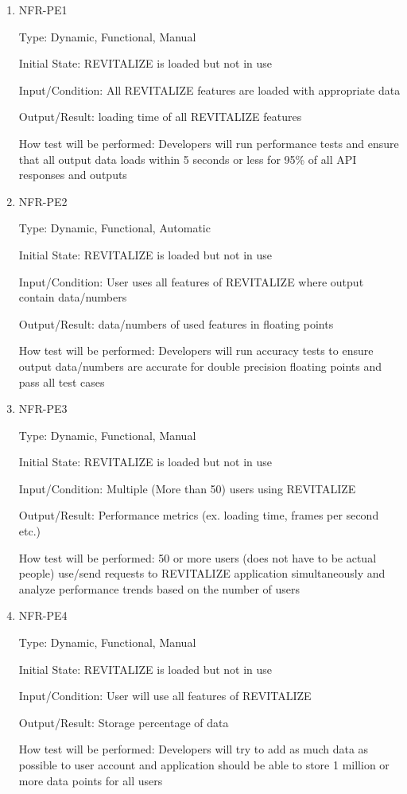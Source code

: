 \documentclass[12pt, titlepage]{article}
\begin{document}
\begin{enumerate}
	
	\item{NFR-PE1\\}
	
	Type: Dynamic, Functional, Manual
	
	Initial State: REVITALIZE is loaded but not in use
	
	Input/Condition: All REVITALIZE features are loaded with appropriate data
	
	Output/Result: loading time of all REVITALIZE features
	
	How test will be performed: Developers will run performance tests and ensure that all output data loads within 5 seconds or less for 95\% of all API responses and outputs
	
	\item{NFR-PE2\\}
	
	Type: Dynamic, Functional, Automatic
	
	Initial State: REVITALIZE is loaded but not in use
	
	Input/Condition: User uses all features of REVITALIZE where output contain data/numbers
	
	Output/Result: data/numbers of used features in floating points
	
	How test will be performed: Developers will run accuracy tests to ensure output data/numbers are accurate for double precision floating points and pass all test cases
	
	\item{NFR-PE3\\}
	
	Type: Dynamic, Functional, Manual
	
	Initial State: REVITALIZE is loaded but not in use
	
	Input/Condition: Multiple (More than 50) users using REVITALIZE
	
	Output/Result: Performance metrics (ex. loading time, frames per second etc.)
	
	How test will be performed: 50 or more users (does not have to be actual people) use/send requests to REVITALIZE application simultaneously and analyze performance trends based on the number of users
	
	\item{NFR-PE4\\}
	
	Type: Dynamic, Functional, Manual
	
	Initial State: REVITALIZE is loaded but not in use
	
	Input/Condition: User will use all features of REVITALIZE
	
	Output/Result: Storage percentage of data
	
	How test will be performed: Developers will try to add as much data as possible to user account and application should be able to store 1 million or more data points for all users
	
\end{enumerate}
\end{document}
